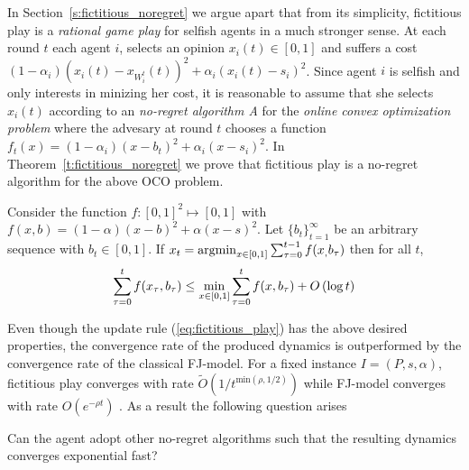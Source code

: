 In Section~\ref{s:fictitious_noregret} we argue apart that from its simplicity, 
fictitious play is a \emph{rational game play} for selfish agents in a much stronger sense. At each round $t$ each agent $i$,
selects an opinion $x_i(t) \in [0,1]$
and suffers a cost $(1-\alpha_i)(x_i(t)-x_{W_i^t}(t))^2 + \alpha_i(x_i(t)-s_i)^2$.
Since agent $i$ is selfish and only interests in minizing her cost, it is reasonable to assume
that she selects $x_i(t)$ according to an \emph{no-regret algorithm A}
for the \emph{online convex optimization problem} where the advesary at round $t$ chooses
a function $f_t(x)=(1-\alpha_i)(x-b_t)^2 + \alpha_i(x-s_i)^2$. In Theorem~\ref{t:fictitious_noregret}
we prove that fictitious play is a no-regret algorithm for the above OCO problem.

\begin{theorem}\label{t:fictitious_noregret}
Consider the function $f:[0,1]^2 \mapsto [0,1]$ with $f(x,b) = (1-\alpha)(x-b)^2 + \alpha(x-s)^2$.
Let $\{b_t\}_{t=1}^\infty$ be an arbitrary sequence with $b_t \in [0,1]$. If $x_t = \operatorname*{argmin}_{x \in [0,1]}\sum_{\tau=0}^{t-1}f(x_,b_\tau)$
then for all $t$, 
\[\sum_{\tau=0}^{t}f(x_\tau,b_\tau) \leq \min_{x \in [0,1]}\sum_{\tau=0}^tf(x,b_\tau) + O\left(\log t\right)\]
\end{theorem}

Even though the update rule (\ref{eq:fictitious_play}) has the above
desired properties, 
the convergence rate of the produced dynamics is outperformed by
the convergence rate of the classical FJ-model. For 
a fixed instance $I=(P,s,\alpha)$, fictitious play converges with rate
$\widetilde{O}(1/t^{\text{min}(\rho,1/2)})$ while FJ-model
converges with rate $O(e^{-\rho t})$ \cite{GS14}.
As a result the following question arises
\begin{question}
Can the agent adopt other no-regret algorithms such that the resulting
dynamics converges exponential fast?
\end{question}

